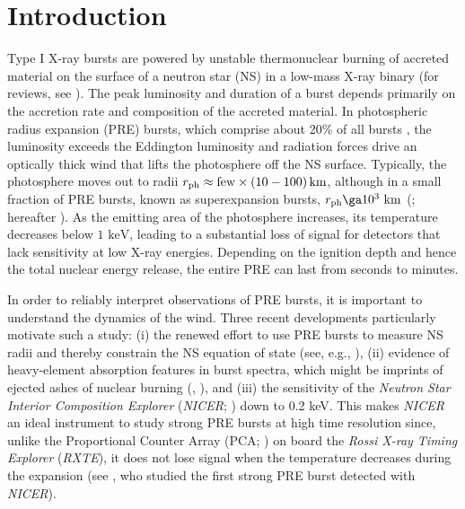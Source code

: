 \documentclass[apj,usenatbib, iop, twocolappendix]{emulateapj}
\newcommand{\trm}[1]{\textrm{#1}}
\begin{document}




\section{Introduction}

Type I X-ray bursts are powered by unstable thermonuclear burning of  accreted material on the surface of a neutron star (NS) in a low-mass X-ray binary (for reviews, see \citealt{Bildsten:98, Strohmayer:06, Galloway:17}).  The peak luminosity and duration of a burst depends primarily on the accretion rate and  composition of the accreted material.  In  photospheric radius expansion (PRE) bursts, which comprise about 20\% of all bursts \citep{Galloway:08}, the luminosity exceeds the Eddington luminosity and radiation forces drive an optically thick wind that lifts the photosphere off the NS surface.  Typically, the photosphere moves out to radii $r_{\rm ph}\approx \trm{few}\times\left(10-100\right)\trm{km}$, although in a small fraction of PRE bursts, known as superexpansion bursts, $r_{\rm ph} \ga 10^3\trm{ km}$ (\citealt{intZand:10}; hereafter ). 
As the emitting area of the photosphere increases, its temperature  decreases below $1\trm{ keV}$, leading to a substantial loss of signal for detectors that lack sensitivity at low X-ray energies.
Depending on the ignition depth and hence the total nuclear energy release, the entire PRE can last from seconds to minutes.

In order to reliably interpret observations of PRE bursts, it is important to understand the dynamics of the wind.  Three recent developments particularly motivate such a study: (i) the renewed effort to use PRE bursts to measure NS radii and thereby constrain the NS equation of state (see, e.g., \citealt{vanParadijs:79, Ozel:10, Ozel:16a, Steiner:10, Steiner:13}), (ii) evidence of heavy-element absorption features in burst spectra, which might be imprints of ejected ashes of nuclear burning  (, \citealt{Barriere:15, Iwai:17, Kajava:17}), and (iii) the sensitivity of the {\it Neutron Star Interior Composition Explorer} ({\it NICER}; \citealt{Gendreau:17}) down to 0.2\trm{ keV}. This makes {\it NICER}  an ideal instrument to study strong PRE bursts at high time resolution since, unlike the Proportional Counter Array (PCA; \citealt{Jahoda:06}) on board the {\it Rossi X-ray Timing Explorer} ({\it RXTE}), it does not lose signal when the temperature decreases during the expansion (see \citet{Keek:18}, who studied the first strong PRE burst detected with {\it NICER}).
\end{document}

